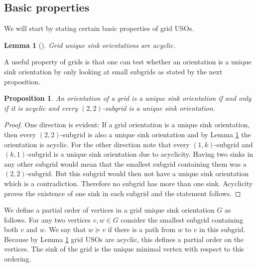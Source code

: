 \documentclass[a4paper,10pt]{article}
\newtheorem{lemma}{Lemma}
\newtheorem{prop}{Proposition}
\newcommand{\JN}[1]{\marginpar{\parbox{4cm}{{\small {\bf JN:} #1}}}} %
\begin{document}

\subsection{Basic properties}

We will start by stating certain basic properties of grid USOs.

\begin{lemma}[\cite{grid08}]
\label{lemma:acyclicity_lemma}
 Grid unique sink orientations are acyclic.
\end{lemma}

A useful property of grids is that one can test whether an orientation is a unique sink orientation by only looking at small subgrids as stated by the next proposition.

\begin{prop}
\label{prop:subgrid_uso_check}
 An orientation of a grid is a unique sink orientation if and only if it is acyclic and every $(2, 2)$-subgrid is a unique sink orientation.
\end{prop}

\begin{proof}
 One direction is evident: If a grid orientation is a unique sink orientation, then every $(2,2)$-subgrid is also a unique sink orientation and by Lemma \ref{lemma:acyclicity_lemma} the orientation is acyclic. For the other direction note that every $(1,k)$-subgrid and $(k,1)$-subgrid is a unique sink orientation due to acyclicity. Having two sinks in any other subgrid would mean that the smallest subgrid containing them was a $(2,2)$-subgrid. But this subgrid would then not have a unique sink orientation which is a contradiction. Therefore no subgrid has more than one sink. Acyclicity proves the existence of one sink in each subgrid and the statement follows.
\end{proof}

We define a partial order of vertices in a grid unique sink orientation $G$ as follows. 
For any two vertices $v,w \in G$ consider the smallest subgrid containing both $v$ and $w$. 
We say that $w \succeq v$ if there is a path from $w$ to $v$ in this subgrid. 
Because by Lemma \ref{lemma:acyclicity_lemma} grid USOs are acyclic, this defines a partial order on the vertices. 
The sink of the grid is the unique minimal vertex with respect to this ordering. 
\end{document}

